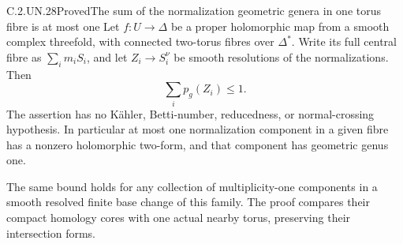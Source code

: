 \begin{statement}{C.2.UN.28}{Proved}{The sum of the normalization geometric genera in one torus fibre is at most one}
Let $f:U\to\Delta$ be a proper holomorphic map from a
smooth complex threefold, with connected two-torus
fibres over $\Delta^*$. Write its full central fibre
as $\sum_i m_iS_i$, and let $Z_i\to S_i^\nu$ be
smooth resolutions of the normalizations. Then
\[
                         \sum_i p_g(Z_i)\le1.
                                                               \tag{C.PG.1}
\]
The assertion has no K\"ahler, Betti-number, reducedness,
or normal-crossing hypothesis. In particular at most
one normalization component in a given fibre has a
nonzero holomorphic two-form, and that component has
geometric genus one.

The same bound holds for any collection of multiplicity-one
components in a smooth resolved finite base change of
this family. The proof compares their compact homology
cores with one actual nearby torus, preserving their
intersection forms.
\end{statement}

